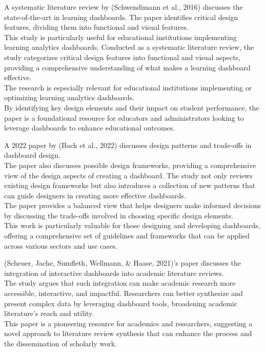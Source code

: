 \documentclass[print]{nuthesis}
\begin{document}
A systematic literature review by (Schwendimann et al., 2016) discusses the state-of-the-art in learning dashboards.
The paper identifies critical design features, dividing them into functional and visual features.\\
This study is particularly useful for educational institutions implementing learning analytics dashboards.
Conducted as a systematic literature review, the study categorizes critical design features into functional and visual aspects, providing a comprehensive understanding of what makes a learning dashboard effective.\\
The research is especially relevant for educational institutions implementing or optimizing learning analytics dashboards.\\
By identifying key design elements and their impact on student performance, the paper is a foundational resource for educators and administrators looking to leverage dashboards to enhance educational outcomes.

A 2022 paper by (Bach et al., 2022) discusses design patterns and trade-offs in dashboard design.\\
The paper also discusses possible design frameworks, providing a comprehensive view of the design aspects of creating a dashboard.
The study not only reviews existing design frameworks but also introduces a collection of new patterns that can guide designers in creating more effective dashboards.\\
The paper provides a balanced view that helps designers make informed decisions by discussing the trade-offs involved in choosing specific design elements.\\
This work is particularly valuable for those designing and developing dashboards, offering a comprehensive set of guidelines and frameworks that can be applied across various sectors and use cases.

(Scheuer, Jache, Sumfleth, Wellmann, \& Haase, 2021)'s paper discusses the integration of interactive dashboards into academic literature reviews.\\
The study argues that such integration can make academic research more accessible, interactive, and impactful.
Researchers can better synthesize and present complex data by leveraging dashboard tools, broadening academic literature's reach and utility.\\
This paper is a pioneering resource for academics and researchers, suggesting a novel approach to literature review synthesis that can enhance the process and the dissemination of scholarly work.
\end{document}
